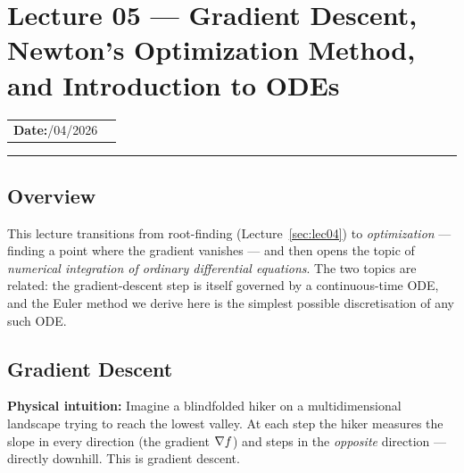 
\section{Lecture 05 — Gradient Descent, Newton's Optimization Method, and
  Introduction to ODEs}\label{sec:lec05}

\begin{center}
\begin{tabular}{ll}
  \textbf{Date:}\quad 30/04/2026 & \\
\end{tabular}
\end{center}
\hrule\vspace{1.5em}

\subsection*{Overview}
This lecture transitions from root-finding (Lecture~\ref{sec:lec04}) to
\emph{optimization} — finding a point where the gradient vanishes — and then
opens the topic of \emph{numerical integration of ordinary differential
equations}. The two topics are related: the gradient-descent step is itself
governed by a continuous-time ODE, and the Euler method we derive here is the
simplest possible discretisation of any such ODE.

\subsection{Gradient Descent}

\noindent\textbf{Physical intuition:} Imagine a blindfolded hiker on a
multidimensional landscape trying to reach the lowest valley. At each step
the hiker measures the slope in every direction (the gradient $\nabla f$) and
steps in the \emph{opposite} direction — directly downhill. This is gradient
descent.

